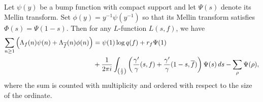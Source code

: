     \begin{theorem*}
      Let $\psi(y)$ be a bump function with compact support and let $\Psi(s)$ denote its Mellin transform. Set $\phi(y) = y^{-1}\psi(y^{-1})$ so that its Mellin transform satisfies $\Phi(s) = \Psi(1-s)$. Then for any $L$-function $L(s,f)$, we have
      \begin{align*}
        \sum_{n \ge 1}\left(\Lambda_{f}(n)\psi(n)+\Lambda_{\overline{f}}(n)\phi(n)\right) &= \psi(1)\log{q(f)}+r_{f}\Psi(1) \\
        &+ \frac{1}{2\pi i}\int_{\left(\frac{1}{2}\right)}\left(\frac{\gamma'}{\gamma}(s,f)+\frac{\gamma'}{\gamma}(1-s,\overline{f})\right)\Psi(s)\,ds-\sum_{\rho}\Psi(\rho),
      \end{align*}
      where the sum is counted with multiplicity and ordered with respect to the size of the ordinate.
    \end{theorem*}
